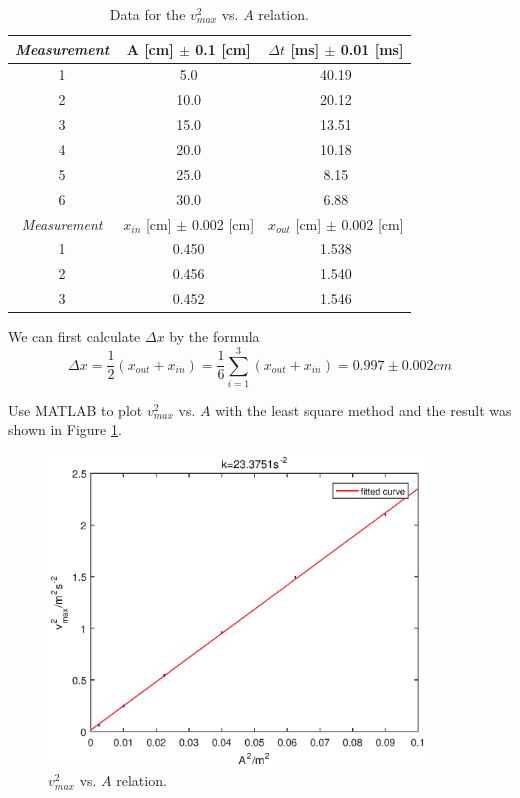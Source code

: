 \documentclass{article}
\begin{document}
\begin{table}[!h]
\begin{center}
\begin{tabular}{|c|c|c|}
\hline
\textit{Measurement} & A [cm] $\pm$ 0.1 [cm] & $\Delta t$ [ms] $\pm$ 0.01 [ms]\\
\hline
1	&	5.0		&	40.19\\
2	&	10.0	&	20.12\\
3	&	15.0	&	13.51\\
4	&	20.0	&	10.18\\
5	&	25.0	&	8.15\\
6	&	30.0	&	6.88\\
\hline
\hline
\textit{Measurement} & $x_{in}$ [cm] $\pm$ 0.002 [cm] & $x_{out}$ [cm] $\pm$ 0.002 [cm]\\
\hline
1	&	0.450	&	1.538\\
2	&	0.456	&	1.540\\
3	&	0.452	&	1.546\\
\hline
\end{tabular}
\caption{Data for the $v_{max}^2$ vs. $A$ relation.}
\label{tab-4}
\end{center}
\end{table}

We can first calculate $\Delta x$ by the formula
$$\Delta x=\frac{1}{2}(x_{out}+x_{in})=\frac{1}{6}\sum_{i=1}^3(x_{out}+x_{in})=0.997\pm0.002cm$$

Use MATLAB to plot $v_{max}^2$ vs. $A$ with the least square method and the result was shown in Figure \ref{fig-7}.\\

\begin{figure}[!h]
	\centering
	\includegraphics[width=10cm]{fig-7.eps}
	\caption{$v_{max}^2$ vs. $A$ relation.
	\label{fig-7}}
\end{figure}
\end{document}
